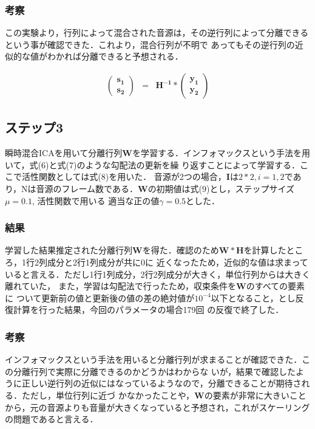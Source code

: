 \documentclass[a4j]{jarticle}
\begin{document}
\subsubsection*{考察}
この実験より，行列によって混合された音源は，その逆行列によって分離できるという事が確認できた．これより，混合行列が不明で
あってもその逆行列の近似的な値がわかれば分離できると予想される．

\begin{eqnarray}
 \left(
\begin{array}{c}
 \bm{s_1}\\
\bm{s_2}
\end{array}
\right)
&=& \bm{H^{-1}} * 
\left(
\begin{array}{c}
 \bm{y_1}\\
 \bm{y_2}
\end{array}
\right)
\end{eqnarray}

\subsection*{ステップ3}
瞬時混合ICAを用いて分離行列$\bm{W}$を学習する．インフォマックスという手法を用いて，式(6)と式(7)のような勾配法の更新を繰
り返すことによって学習する．ここで活性関数としては式(8)を用いた．
音源が2つの場合，$\bm{I}$は$2*2, i=1,2$であり，Nは音源のフレーム数である．$\bm{W}$の初期値は式(9)とし，ステップサイズ$\mu = 0.1$, 活性関数で用いる
適当な正の値$\gamma = 0.5$とした．
\subsubsection*{結果}
学習した結果推定された分離行列$\bm{W}$を得た．確認のため$\bm{W} * \bm{H}$を計算したところ，1行2列成分と2行1列成分が共に0に
近くなったため，近似的な値は求まっていると言える．ただし1行1列成分，2行2列成分が大きく，単位行列からは大きく離れていた，
また，学習は勾配法で行ったため，収束条件を$\bm{W}$のすべての要素に
ついて更新前の値と更新後の値の差の絶対値が$10^{-4}$以下となること，とし反復計算を行った結果，今回のパラメータの場合179回
の反復で終了した．
\subsubsection*{考察}
インフォマックスという手法を用いると分離行列が求まることが確認できた．この分離行列で実際に分離できるのかどうかはわからな
いが，結果で確認したように正しい逆行列の近似にはなっているようなので，分離できることが期待される．ただし，単位行列に近づ
かなかったことや，$\bm{W}$の要素が非常に大きいことから，元の音源よりも音量が大きくなっていると予想され，これがスケーリング
の問題であると言える．
\end{document}
